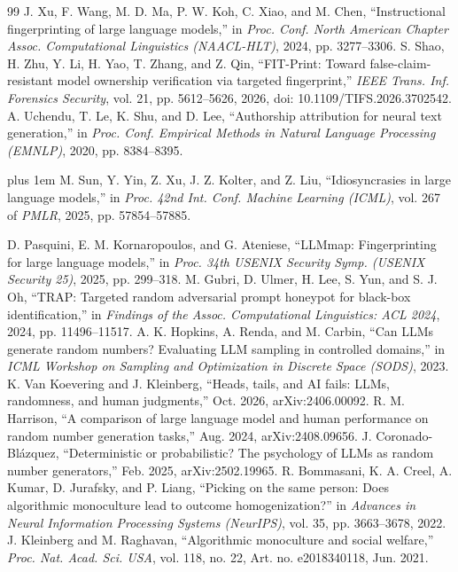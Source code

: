 \begin{thebibliography}{99}
 J. Xu, F. Wang, M. D. Ma, P. W. Koh, C. Xiao, and M. Chen, ``Instructional fingerprinting of large language models,'' in \emph{Proc. Conf. North American Chapter Assoc. Computational Linguistics (NAACL-HLT)}, 2024, pp. 3277--3306.
 S. Shao, H. Zhu, Y. Li, H. Yao, T. Zhang, and Z. Qin, ``FIT-Print: Toward false-claim-resistant model ownership verification via targeted fingerprint,'' \emph{IEEE Trans. Inf. Forensics Security}, vol. 21, pp. 5612--5626, 2026, doi: 10.1109/TIFS.2026.3702542.
 A. Uchendu, T. Le, K. Shu, and D. Lee, ``Authorship attribution for neural text generation,'' in \emph{Proc. Conf. Empirical Methods in Natural Language Processing (EMNLP)}, 2020, pp. 8384--8395.
 { \rightskip=0pt plus 1em M. Sun, Y. Yin, Z. Xu, J. Z. Kolter, and Z. Liu, ``Idiosyncrasies in large language models,'' in \emph{Proc. 42nd Int. Conf. Machine Learning (ICML)}, vol. 267 of \emph{PMLR}, 2025, pp. 57854--57885.\par}
 D. Pasquini, E. M. Kornaropoulos, and G. Ateniese, ``LLMmap: Fingerprinting for large language models,'' in \emph{Proc. 34th USENIX Security Symp. (USENIX Security 25)}, 2025, pp. 299--318.
 M. Gubri, D. Ulmer, H. Lee, S. Yun, and S. J. Oh, ``TRAP: Targeted random adversarial prompt honeypot for black-box identification,'' in \emph{Findings of the Assoc. Computational Linguistics: ACL 2024}, 2024, pp. 11496--11517.
 A. K. Hopkins, A. Renda, and M. Carbin, ``Can LLMs generate random numbers? Evaluating LLM sampling in controlled domains,'' in \emph{ICML Workshop on Sampling and Optimization in Discrete Space (SODS)}, 2023.
 K. Van Koevering and J. Kleinberg, ``Heads, tails, and AI fails: LLMs, randomness, and human judgments,'' Oct. 2026, arXiv:2406.00092.
 R. M. Harrison, ``A comparison of large language model and human performance on random number generation tasks,'' Aug. 2024, arXiv:2408.09656.
 J. Coronado-\hspace{0pt}Bl\'{a}zquez, ``Deterministic or probabilistic? The psychology of LLMs as random number generators,'' Feb. 2025, arXiv:2502.19965.
 R. Bommasani, K. A. Creel, A. Kumar, D. Jurafsky, and P. Liang, ``Picking on the same person: Does algorithmic monoculture lead to outcome homogenization?'' in \emph{Advances in Neural Information Processing Systems (NeurIPS)}, vol. 35, pp. 3663--3678, 2022.
 J. Kleinberg and M. Raghavan, ``Algorithmic monoculture and social welfare,'' \emph{Proc. Nat. Acad. Sci. USA}, vol. 118, no. 22, Art. no. e2018340118, Jun. 2021.

\end{thebibliography}
